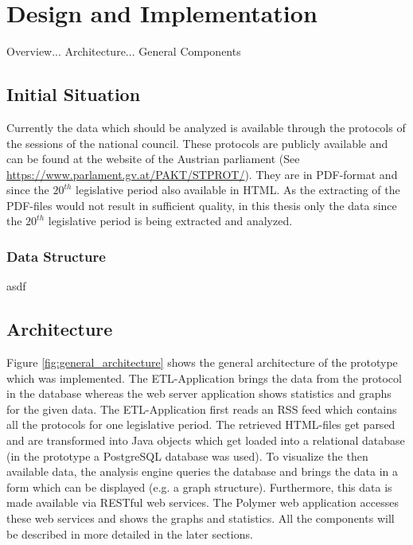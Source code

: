 \chapter{Design and Implementation}
\label{chap:implementation}

Overview... Architecture... General Components

\section{Initial Situation}
Currently the data which should be analyzed is available through the protocols of the sessions of the national council. These protocols are publicly available and can be found at the website of the Austrian parliament (See \url{https://www.parlament.gv.at/PAKT/STPROT/}). They are in PDF-format and since the $20^{th}$ legislative period also available in HTML. As the extracting of the PDF-files would not result in sufficient quality, in this thesis only the data since the $20^{th}$ legislative period is being extracted and analyzed.

\subsection{Data Structure}
asdf

\section{Architecture}
Figure \ref{fig:general_architecture} shows the general architecture of the prototype which was implemented. The ETL-Application brings the data from the protocol in the database whereas the web server application shows statistics and graphs for the given data. The ETL-Application first reads an RSS feed which contains all the protocols for one legislative period. The retrieved HTML-files get parsed and are transformed into Java objects which get loaded into a relational database (in the prototype a PostgreSQL database was used). To visualize the then available data, the analysis engine queries the database and brings the data in a form which can be displayed (e.g. a graph structure). Furthermore, this data is made available via RESTful web services. The Polymer web application accesses these web services and shows the graphs and statistics. All the components will be described in more detailed in the later sections.

